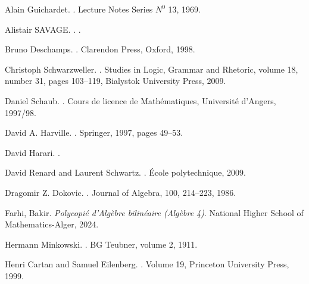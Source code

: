 \documentclass[a4paper, 14pt]{report}
\begin{document}
\begin{onehalfspace}
{\begin{thebibliography}{99}
				Alain Guichardet.
				.
				\newblock Lecture Notes Series $N^0$ 13, 1969.
				
				Alistair SAVAGE.
				.
				.
				
				Bruno Deschamps.
				.
				\newblock Clarendon Press, Oxford, 1998.
				
				Christoph Schwarzweller.
				.
				\newblock Studies in Logic, Grammar and Rhetoric, volume 18, number 31, pages 103--119, Bialystok University Press, 2009.
				
				Daniel Schaub.
				.
				\newblock Cours de licence de Mathématiques, Université d’Angers, 1997/98.
				
				David A. Harville.
				.
				\newblock Springer, 1997, pages 49--53.
				
				David Harari.
				.
				
				David Renard and Laurent Schwartz.  
				.  
				\newblock École polytechnique, 2009.
				
				
				Dragomir Z. Dokovic.
				.
				\newblock Journal of Algebra, 100, 214--223, 1986.
				
				Farhi, Bakir.
				\newblock \textit{Polycopié d'Algèbre bilinéaire (Algèbre 4)}.
				\newblock National Higher School of Mathematics-Alger, 2024.
				
				
				Hermann Minkowski.
				.
				\newblock BG Teubner, volume 2, 1911.
				
				Henri Cartan and Samuel Eilenberg.
				.
				\newblock Volume 19, Princeton University Press, 1999.
				

\end{thebibliography}}
\end{onehalfspace}
\end{document}
